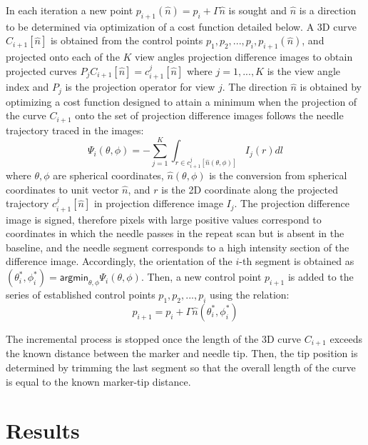 \documentclass[letterpaper, 11 pt, conference]{ieeeconf} %
\begin{document}
In each iteration a new point $p_{i+1}(\hat{n}) = p_i + \Gamma \hat{n}$ is sought and $\hat{n}$ is a direction to be determined via optimization of a cost function detailed below.
A 3D curve $C_{i+1}[\hat{n}]$ is obtained from the control points $p_1, p_2, ..., p_i, p_{i+1}(\hat{n})$, and projected onto each of the $K$ view angles projection difference images to obtain projected curves $P_j C_{i+1}[\hat{n}] = c_{i+1}^j[\hat{n}]$ where $j=1,...,K$ is the view angle index and $P_j$ is the projection operator for view $j$.
The direction $\hat{n}$ is obtained by optimizing a cost function designed to attain a minimum when the projection of the curve $C_{i+1}$ onto the set of projection difference images follows the needle trajectory traced in the images:
\[ \Psi_i(\theta, \phi) = -\sum_{j=1}^K{\int_{r \in c_{i+1}^j[\hat{n}(\theta, \phi)]} {I_j(r)dl}} \]
where $ \theta, \phi$ are spherical coordinates, $ \hat{n}(\theta, \phi) $ is the conversion from spherical coordinates to unit vector $ \hat{n} $, and $r$ is the 2D coordinate along the projected trajectory $c_{i+1}^j[\hat{n}]$ in projection difference image $I_j$. The projection difference image is signed, therefore pixels with large positive values correspond to coordinates in which the needle passes in the repeat scan but is absent in the baseline, and the needle segment corresponds to a high intensity section of the difference image.
Accordingly, the orientation of the $i$-th segment is obtained as $(\theta_i^*, \phi_i^*) = \textsf{argmin}_{\theta, \phi} \Psi_i ( \theta, \phi)$. Then, a new control point $p_{i+1}$ is added to the series of established control points $p_1, p_2, ..., p_i$ using the relation:
$$ p_{i+1} = p_i + \Gamma \hat{n}(\theta_i^*, \phi_i^*) $$

The incremental process is stopped once the length of the 3D curve $C_{i+1}$ exceeds the known distance between the marker and needle tip. Then, the tip position is determined by trimming the last segment so that the overall length of the curve is equal to the known marker-tip distance.



\section{Results}
\end{document}
